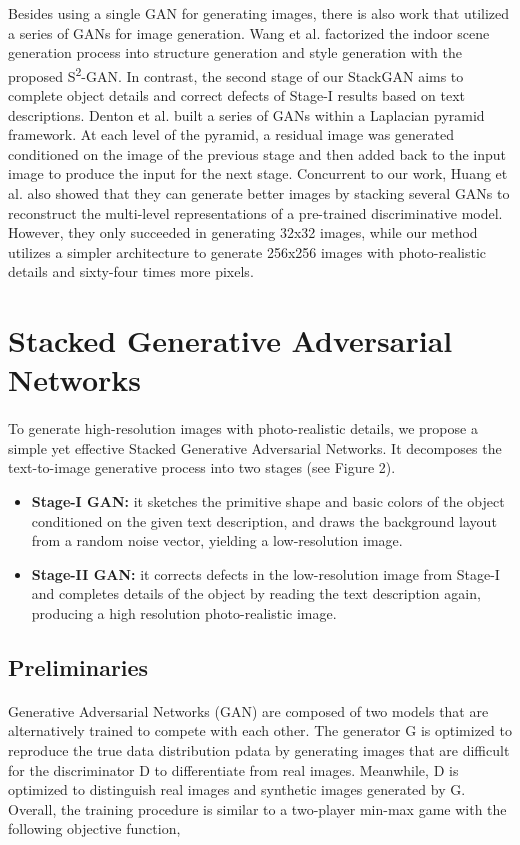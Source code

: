 \documentclass[a4paper,12pt,oneside]{article}
\begin{document}
Besides using a single GAN for generating images, there is also work that utilized a series of GANs for image generation. Wang et al. factorized the indoor scene generation process into structure generation and style generation with the proposed S\textsuperscript{2}-GAN. In contrast, the second stage of our StackGAN aims to complete object details and correct defects of Stage-I results based on text descriptions. Denton et al. built a series of GANs within a Laplacian pyramid framework. At each level of the pyramid, a residual image was generated conditioned on the image of the previous stage and then added back to the input image to produce the input for the next stage. Concurrent to our work, Huang et al. also showed that they can generate better images by stacking several GANs to reconstruct the multi-level representations of a pre-trained discriminative model. However, they only succeeded in generating 32x32 images, while our method utilizes a simpler architecture to generate 256x256 images with photo-realistic details and sixty-four times more pixels. 

\newpage
\section{Stacked Generative Adversarial Networks}
\paragraph{}
To generate high-resolution images with photo-realistic details, we propose a simple yet effective Stacked Generative Adversarial Networks. It decomposes the text-to-image generative process into two stages (see Figure 2). 
\begin{itemize}
\item \textbf{Stage-I GAN:} it sketches the primitive shape and basic colors of the object conditioned on the given text description, and draws the background layout from a random noise vector, yielding a low-resolution image. 
\item \textbf{Stage-II GAN:} it corrects defects in the low-resolution image from Stage-I and completes details of the object by reading the text description again, producing a high resolution photo-realistic image. 
\end{itemize}

\subsection{Preliminaries }
\paragraph{}
Generative Adversarial Networks (GAN) are composed of two models that are alternatively trained to compete with each other. The generator G is optimized to reproduce the true data distribution pdata by generating images that are difficult for the discriminator D to differentiate from real images. Meanwhile, D is optimized to distinguish real images and synthetic images generated by G. Overall, the training procedure is similar to a two-player min-max game with the following objective function, 
\end{document}
